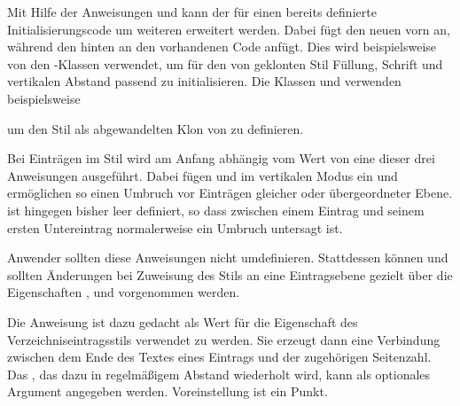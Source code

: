 Mit Hilfe der Anweisungen  und
 kann der für einen  bereits
definierte Initialisierungscode um weiteren 
erweitert werden. Dabei fügt  den neuen
 vorn an, während  den
 hinten an den vorhandenen Code anfügt. Dies wird
beispielsweise von den \KOMAScript-Klassen verwendet, um für den von
 geklonten Stil  Füllung, Schrift und vertikalen
Abstand passend zu initialisieren. Die Klassen  und
 verwenden beispielsweise
\begin{lstcode}
  \TOCEntryStyleStartInitCode{section}{%
    \expandafter\providecommand%
    \csname scr@tso@#1@linefill\endcsname
    {\TOCLineLeaderFill\relax}%
  }
\end{lstcode}
um den Stil  als abgewandelten Klon von  zu
definieren.%
\EndIndexGroup


\begin{Declaration}
\end{Declaration}
Bei Einträgen im Stil
 wird am Anfang abhängig vom Wert von
 eine dieser drei Anweisungen
ausgeführt. Dabei fügen  und
 im vertikalen Modus
 ein und ermöglichen so
einen Umbruch vor Einträgen gleicher oder übergeordneter
Ebene.  ist hingegen bisher leer definiert, so
dass zwischen einem Eintrag und seinem ersten Untereintrag normalerweise ein
Umbruch untersagt ist.

Anwender sollten diese Anweisungen nicht umdefinieren. Stattdessen können und
sollten Änderungen bei Zuweisung des Stils an eine Eintragsebene gezielt über
die Eigenschaften ,  und
 vorgenommen werden.%
\EndIndexGroup


\begin{Declaration}
\end{Declaration}
Die Anweisung ist dazu gedacht
als Wert für die Eigenschaft  des Verzeichniseintragsstils
 verwendet zu werden. Sie erzeugt dann eine Verbindung zwischen
dem Ende des Textes eines Eintrags und der zugehörigen Seitenzahl. Das
, das dazu in regelmäßigem Abstand wiederholt wird, kann
als optionales Argument angegeben werden. Voreinstellung ist ein
Punkt.

